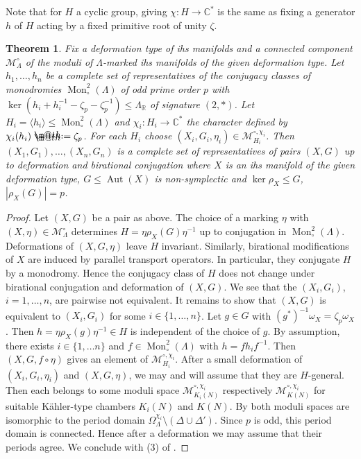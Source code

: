 \documentclass{amsart}
\makeatletter
\theoremstyle{definition}
\theoremstyle{plain}
\newtheorem{theorem}[definition]{Theorem}
\DeclareMathOperator{\Aut}{Aut}
\DeclareMathOperator{\Mo}{Mon}
\newcommand{\RR}{\mathbb{R}}
\newcommand{\CC}{\mathbb{C}}
\newcommand{\M}{\mathcal{M}}
\newcommand*{\defeq}{\mathrel{\rlap{%
                     \raisebox{0.3ex}{$\m@th\cdot$}}%
                     \raisebox{-0.3ex}{$\m@th\cdot$}}%
                     =}
\makeatother
\begin{document}
 Note that for $H$ a cyclic group, giving $\chi\colon H \rightarrow \CC^*$ is the same as fixing a generator $h$ of $H$ acting by a fixed primitive root of unity $\zeta$.

 \begin{theorem}\label{thm:non-symplectic-classification}
  Fix a deformation type of ihs manifolds and a connected component $\M_\Lambda^\circ$ of the moduli of $\Lambda$-marked ihs manifolds of the given deformation type.
  Let $h_1, \dots, h_n$ be a complete set of representatives of the conjugacy classes of monodromies $\Mo^2_\circ(\Lambda)$ of odd prime order $p$ with $\ker (h_i + h_i^{-1} - \zeta_p - \zeta_p^{-1})\leq \Lambda_\RR$ of signature $(2,*)$.
  Let $H_i = \langle h_i \rangle \leq \Mo^2_\circ(\Lambda)$ and $\chi_i\colon H_i \rightarrow \CC^*$ the character defined by $\chi_i(h_i)\defeq \zeta_p$.
  For each $H_i$ choose $(X_i,G_i,\eta_i) \in \M^{\circ,\chi_i}_{H_i}$.
  Then $(X_1, G_1), \dots, (X_n, G_n)$ is a complete set of representatives of pairs $(X,G)$ up to deformation and birational conjugation where $X$ is an ihs manifold of the given deformation type, $G\leq \Aut(X)$ is non-symplectic and $\ker \rho_X \leq G$, $|\rho_X(G)|=p$.
 \end{theorem}
 \begin{proof}
 Let $(X,G)$ be a pair as above. The choice of a marking $\eta$ with $(X,\eta) \in \M_\Lambda^\circ$ determines $H=\eta\rho_X(G)\eta^{-1}$ up to conjugation in $\Mo^2_\circ(\Lambda)$.
 Deformations of $(X,G,\eta)$ leave $H$ invariant.
 Similarly, birational modifications of $X$ are induced by parallel transport operators. In particular, they conjugate $H$ by a monodromy. Hence the conjugacy class of $H$ does not change under birational conjugation and deformation of $(X,G)$.
 We see that the $(X_i,G_i)$, $i=1,\dots, n$, are pairwise not equivalent.
 It remains to show that $(X,G)$ is equivalent to
 $(X_i,G_i)$ for some $i \in \{ 1, \dots, n\}$.
 Let $g\in G$ with $(g^*)^{-1} \omega_X = \zeta_p\omega_X$.
 Then $h = \eta \rho_X(g) \eta^{-1} \in H$ is independent of the choice of $g$.
 By assumption, there exists $i \in \{1,\dots n\}$ and $f \in \Mo^2_\circ(\Lambda)$ with $h = f h_i f^{-1}$.
 Then $(X,G,f\circ \eta)$ gives an element of $\M^{\circ,\chi_i}_{H_i}$.
 After a small deformation of $(X_i,G_i,\eta_i)$ and $(X,G,\eta)$, we may and will assume that they are $H$-general.
 Then each belongs to some moduli space $\M^{\circ, \chi_i}_{K_i(N)}$ respectively $\M^{\circ, \chi_i}_{K(N)}$ for suitable K\"ahler-type chambers $K_i(N)$ and $K(N)$.
 By   both moduli spaces are isomorphic to the period domain $\Omega^{\chi_i}_\Lambda \setminus (\Delta \cup \Delta')$. Since $p$ is odd, this period domain is connected. Hence after a deformation we may assume that their periods agree. We conclude with (3) of  .
\end{proof}
\end{document}
